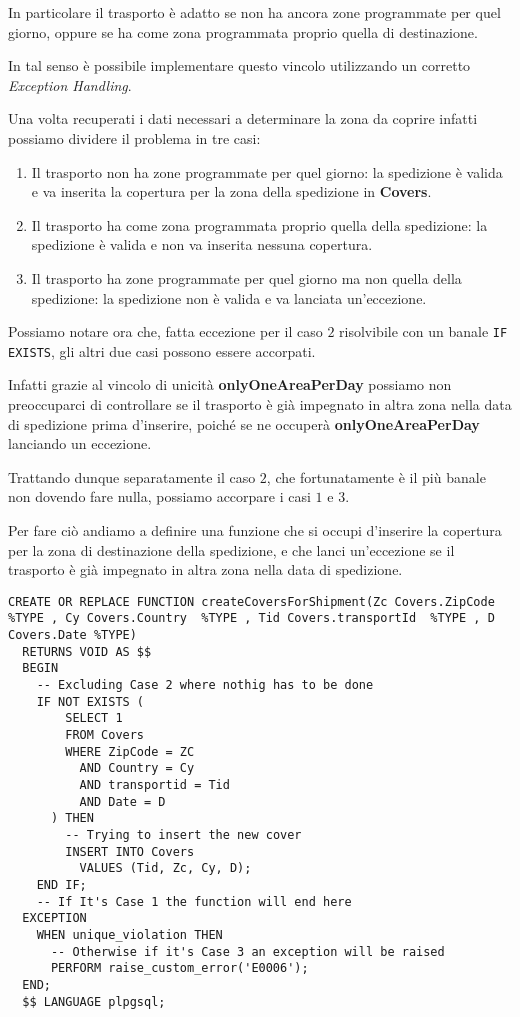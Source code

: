 In particolare il trasporto è adatto se non ha ancora zone programmate per quel giorno, oppure se ha come zona programmata proprio quella di destinazione.

In tal senso è possibile implementare questo vincolo utilizzando un corretto \textit{Exception Handling}.

Una volta recuperati i dati necessari a determinare la zona da coprire infatti possiamo dividere il problema in tre casi:

\begin{enumerate}
  \item Il trasporto non ha zone programmate per quel giorno: la spedizione è valida e va inserita la copertura per la zona della spedizione in \textbf{Covers}.
  \item Il trasporto ha come zona programmata proprio quella della spedizione: la spedizione è valida e non va inserita nessuna copertura.
  \item Il trasporto ha zone programmate per quel giorno ma non quella della spedizione: la spedizione non è valida e va lanciata un'eccezione.
\end{enumerate}

Possiamo notare ora che, fatta eccezione per il caso \(2\) risolvibile con un banale \lstinline{IF EXISTS}, gli altri due casi possono essere accorpati.

Infatti grazie al vincolo di unicità \textbf{onlyOneAreaPerDay} possiamo non preoccuparci di controllare se il trasporto è già impegnato in altra zona nella data di spedizione prima d'inserire, poiché se ne occuperà \textbf{onlyOneAreaPerDay} lanciando un eccezione.

Trattando dunque separatamente il caso \(2\), che fortunatamente è il più banale non dovendo fare nulla, possiamo accorpare i casi \(1\) e \(3\).

Per fare ciò andiamo a definire una funzione che si occupi d'inserire la copertura per la zona di destinazione della spedizione, e che lanci un'eccezione se il trasporto è già impegnato in altra zona nella data di spedizione.

\newpage

\begin{lstlisting}[caption={funzione per inserimento in \textbf{Covers}}]
  CREATE OR REPLACE FUNCTION createCoversForShipment(Zc Covers.ZipCode  %TYPE , Cy Covers.Country  %TYPE , Tid Covers.transportId  %TYPE , D Covers.Date %TYPE)
  RETURNS VOID AS $$
  BEGIN
    -- Excluding Case 2 where nothig has to be done
    IF NOT EXISTS (
        SELECT 1
        FROM Covers
        WHERE ZipCode = ZC
          AND Country = Cy
          AND transportid = Tid
          AND Date = D
      ) THEN
        -- Trying to insert the new cover
        INSERT INTO Covers
          VALUES (Tid, Zc, Cy, D);
    END IF;
    -- If It's Case 1 the function will end here
  EXCEPTION
    WHEN unique_violation THEN 
      -- Otherwise if it's Case 3 an exception will be raised
      PERFORM raise_custom_error('E0006');
  END;
  $$ LANGUAGE plpgsql;
\end{lstlisting}

